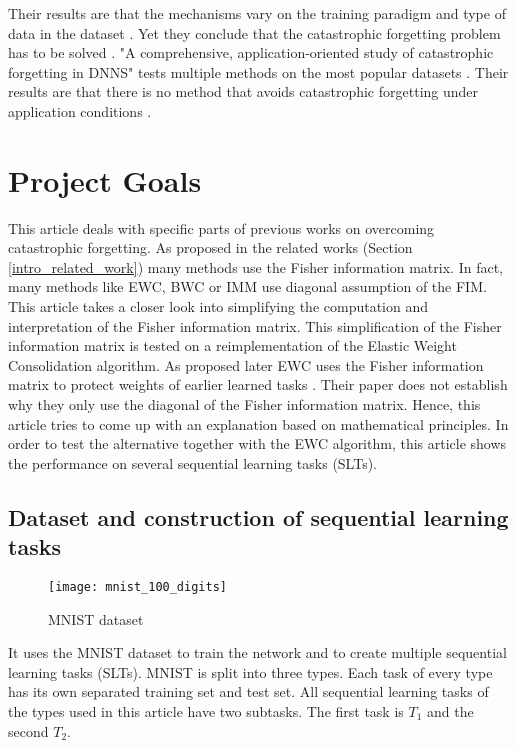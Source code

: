 Their results are that the mechanisms vary on the training paradigm and type of data in the dataset \cite{measuring_cf_in_nns}.
Yet they conclude that the catastrophic forgetting problem has to be solved \cite{measuring_cf_in_nns}.
\newline
"A comprehensive, application-oriented study of catastrophic forgetting in DNNS" \cite{cf_application_oriented_study} tests multiple methods on the most popular datasets \cite{cf_application_oriented_study}.
Their results are that there is no method that avoids catastrophic forgetting under application conditions \cite{cf_application_oriented_study}.

\section{Project Goals}
\label{project_goals}

This article deals with specific parts of previous works on overcoming catastrophic forgetting.
As proposed in the related works (Section \ref{intro_related_work}) many methods use the Fisher information matrix.
In fact, many methods like EWC, BWC or IMM use diagonal assumption of the FIM.
This article takes a closer look into simplifying the computation and interpretation of the Fisher information matrix.
This simplification of the Fisher information matrix is tested on a reimplementation of the Elastic Weight Consolidation algorithm.
As proposed later EWC uses the Fisher information matrix to protect weights of earlier learned tasks \cite{elastic-weight-consolidation}.
Their paper does not establish why they only use the diagonal of the Fisher information matrix.
Hence, this article tries to come up with an explanation based on mathematical principles.
In order to test the alternative together with the EWC algorithm, this article shows the performance on several sequential learning tasks (SLTs).

\subsection*{Dataset and construction of sequential learning tasks}

\begin{figure}[H]
    \centering
    \texttt{[image: mnist\_100\_digits]}
    \caption{\cite{mnist_examples_image} MNIST dataset}
    \label{fig:intro_mnist_examples}
\end{figure}

It uses the MNIST dataset to train the network and to create multiple sequential learning tasks (SLTs).
MNIST is split into three types.
Each task of every type has its own separated training set and test set.
All sequential learning tasks of the types used in this article have two subtasks.
The first task is $T_1$ and the second $T_2$.

